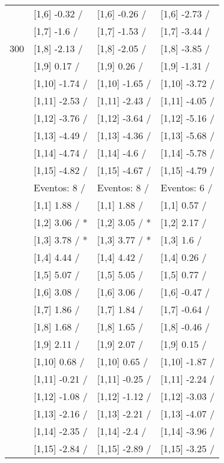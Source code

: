 \begin{table}
\begin{tabular}[t]{llll}
 & {}[1,6] -0.32  / & {}[1,6] -0.26  / & {}[1,6] -2.73  /\\
 & {}[1,7] -1.6  / & {}[1,7] -1.53  / & {}[1,7] -3.44  /\\
300 & {}[1,8] -2.13  / & {}[1,8] -2.05  / & {}[1,8] -3.85  /\\
\addlinespace
 & {}[1,9] 0.17  / & {}[1,9] 0.26  / & {}[1,9] -1.31  /\\
 & {}[1,10] -1.74  / & {}[1,10] -1.65  / & {}[1,10] -3.72  /\\
 & {}[1,11] -2.53  / & {}[1,11] -2.43  / & {}[1,11] -4.05  /\\
 & {}[1,12] -3.76  / & {}[1,12] -3.64  / & {}[1,12] -5.16  /\\
 & {}[1,13] -4.49  / & {}[1,13] -4.36  / & {}[1,13] -5.68  /\\
\addlinespace
 & {}[1,14] -4.74  / & {}[1,14] -4.6  / & {}[1,14] -5.78  /\\
 & {}[1,15] -4.82  / & {}[1,15] -4.67  / & {}[1,15] -4.79  /\\
 & Eventos:  8 / & Eventos:  8 / & Eventos:  6 /\\
 & {}[1,1] 1.88  / & {}[1,1] 1.88  / & {}[1,1] 0.57  /\\
 & {}[1,2] 3.06  / * & {}[1,2] 3.05  / * & {}[1,2] 2.17  /\\
\addlinespace
 & {}[1,3] 3.78  / * & {}[1,3] 3.77  / * & {}[1,3] 1.6  /\\
 & {}[1,4] 4.44  / & {}[1,4] 4.42  / & {}[1,4] 0.26  /\\
 & {}[1,5] 5.07  / & {}[1,5] 5.05  / & {}[1,5] 0.77  /\\
 & {}[1,6] 3.08  / & {}[1,6] 3.06  / & {}[1,6] -0.47  /\\
 & {}[1,7] 1.86  / & {}[1,7] 1.84  / & {}[1,7] -0.64  /\\
\addlinespace
500 & {}[1,8] 1.68  / & {}[1,8] 1.65  / & {}[1,8] -0.46  /\\
 & {}[1,9] 2.11  / & {}[1,9] 2.07  / & {}[1,9] 0.15  /\\
 & {}[1,10] 0.68  / & {}[1,10] 0.65  / & {}[1,10] -1.87  /\\
 & {}[1,11] -0.21  / & {}[1,11] -0.25  / & {}[1,11] -2.24  /\\
 & {}[1,12] -1.08  / & {}[1,12] -1.12  / & {}[1,12] -3.03  /\\
\addlinespace
 & {}[1,13] -2.16  / & {}[1,13] -2.21  / & {}[1,13] -4.07  /\\
 & {}[1,14] -2.35  / & {}[1,14] -2.4  / & {}[1,14] -3.96  /\\
 & {}[1,15] -2.84  / & {}[1,15] -2.89  / & {}[1,15] -3.25  /\\
\bottomrule
\end{tabular}
\end{table}
